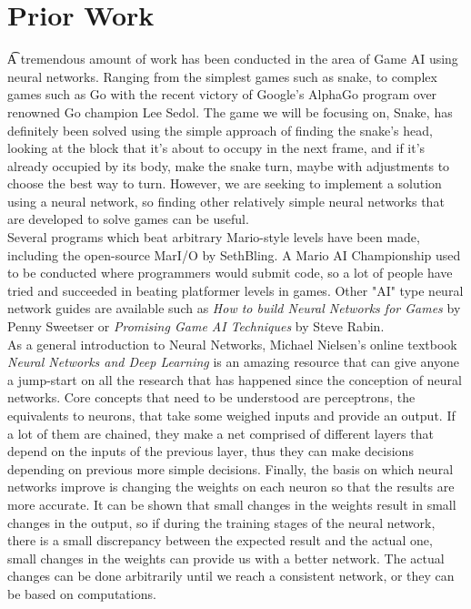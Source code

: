 \documentclass{sigplanconf}
\begin{document}
\section{Prior Work}
\t A tremendous amount of work has been conducted in the area of Game AI using neural networks. Ranging from the simplest games such as snake, to complex games such as Go with the recent victory of Google's AlphaGo program over renowned Go champion Lee Sedol. The game we will be focusing on, Snake, has definitely been solved using the simple approach of finding the snake's head, looking at the block that it's about to occupy in the next frame, and if it's already occupied by its body, make the snake turn, maybe with adjustments to choose the best way to turn. However, we are seeking to implement a solution using a neural network, so finding other relatively simple neural networks that are developed to solve games can be useful.\\
Several programs which beat arbitrary Mario-style levels have been made, including the open-source MarI/O by SethBling. A Mario AI Championship used to be conducted where programmers would submit code, so a lot of people have tried and succeeded in beating platformer levels in games. Other "AI" type neural network guides are available such as \textit{How to build Neural Networks for Games} by Penny Sweetser or \textit{Promising Game AI Techniques} by Steve Rabin.\\
As a general introduction to Neural Networks, Michael Nielsen's online textbook \textit{Neural Networks and Deep Learning} is an amazing resource that can give anyone a jump-start on all the research that has happened since the conception of neural networks. Core concepts that need to be understood are perceptrons, the equivalents to neurons, that take some weighed inputs and provide an output. If a lot of them are chained, they make a net comprised of different layers that depend on the inputs of the previous layer, thus they can make decisions depending on previous more simple decisions. Finally, the basis on which neural networks improve is changing the weights on each neuron so that the results are more accurate. It can be shown that small changes in the weights result in small changes in the output, so if during the training stages of the neural network, there is a small discrepancy between the expected result and the actual one, small changes in the weights can provide us with a better network. The actual changes can be done arbitrarily until we reach a consistent network, or they can be based on computations.\\
\end{document}
